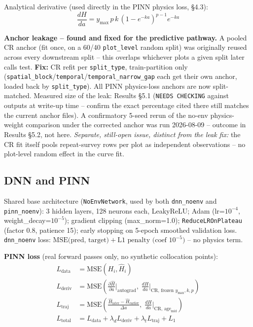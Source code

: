 Analytical derivative (used directly in the PINN physics loss, \S4.3):
\[
\frac{dH}{da} = y_{\max}\, p\, k\, \left(1-e^{-ka}\right)^{p-1} e^{-ka}
\]

\textbf{Anchor leakage -- found and fixed for the predictive pathway.} A pooled CR anchor (fit
once, on a 60/40 \texttt{plot\_level} random split) was originally reused across every downstream
split -- this overlaps whichever plots a given split later calls test.
\textbf{Fix:} CR refit per \texttt{split\_type}, train-partition only
(\texttt{spatial\_block}/\texttt{temporal}/\texttt{temporal\_narrow\_gap} each get their own
anchor, loaded back by \texttt{split\_type}). All PINN physics-loss anchors are now split-matched.
Measured size of the leak: Results \S5.1 (\texttt{NEEDS CHECKING} against outputs at
write-up time -- confirm the exact percentage cited there still matches the current anchor files).
A confirmatory 5-seed rerun of the no-env physics-weight comparison under the corrected anchor was
run 2026-08-09 -- outcome in Results \S5.2, not here.
\textit{Separate, still-open issue, distinct from the leak fix:} the CR fit itself pools
repeat-survey rows per plot as independent observations -- no plot-level random effect in the
curve fit.

\subsection*{DNN and PINN}

Shared base architecture (\texttt{NoEnvNetwork}, used by both \texttt{dnn\_noenv} and
\texttt{pinn\_noenv}): 3 hidden layers, 128 neurons each, LeakyReLU; Adam (lr=$10^{-4}$,
weight\_decay=$10^{-5}$); gradient clipping (max\_norm=1.0); \texttt{ReduceLROnPlateau} (factor
0.8, patience 15); early stopping on 5-epoch smoothed validation loss. \texttt{dnn\_noenv} loss:
$\text{MSE(pred, target)} + \text{L1 penalty (coef } 10^{-5}\text{)}$ -- no physics term.

\textbf{PINN loss} (real forward passes only, no synthetic collocation points):
\begin{align*}
L_{\text{data}} &= \text{MSE}(H_i, \hat H_i) \\
L_{\text{deriv}} &= \text{MSE}\!\left(\tfrac{\partial \hat H}{\partial a}\Big|_{\text{autograd}},\;
  \tfrac{dH}{da}\Big|_{\text{CR, frozen } y_{\max},k,p}\right) \\
L_{\text{traj}} &= \text{MSE}\!\left(\tfrac{\hat H_{\text{later}}-\hat H_{\text{earlier}}}{\Delta a},\;
  \tfrac{dH}{da}\Big|_{\text{CR, age}_{\text{mid}}}\right) \\
L_{\text{total}} &= L_{\text{data}} + \lambda_d L_{\text{deriv}} + \lambda_t L_{\text{traj}} + L_1
\end{align*}

